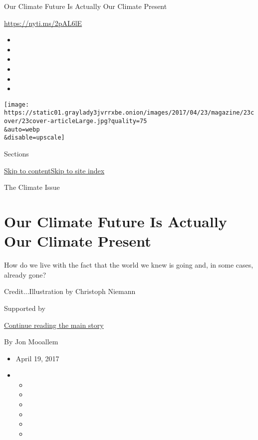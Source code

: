 Our Climate Future Is Actually Our Climate Present

\url{https://nyti.ms/2pAL6lE}

\begin{itemize}
\item
\item
\item
\item
\item
\item
\end{itemize}

\texttt{[image: https://static01.graylady3jvrrxbe.onion/images/2017/04/23/magazine/23cover/23cover-articleLarge.jpg?quality=75\\\&auto=webp\\\&disable=upscale]}

Sections

\protect\hyperlink{site-content}{Skip to
content}\protect\hyperlink{site-index}{Skip to site index}

The Climate Issue

\hypertarget{our-climate-future-is-actually-our-climate-present}{%
\section{Our Climate Future Is Actually Our Climate
Present}\label{our-climate-future-is-actually-our-climate-present}}

How do we live with the fact that the world we knew is going and, in
some cases, already gone?

Credit...Illustration by Christoph Niemann

Supported by

\protect\hyperlink{after-sponsor}{Continue reading the main story}

By Jon Mooallem

\begin{itemize}
\item
  April 19, 2017
\item
  \begin{itemize}
  \item
  \item
  \item
  \item
  \item
  \item
  \end{itemize}
\end{itemize}

